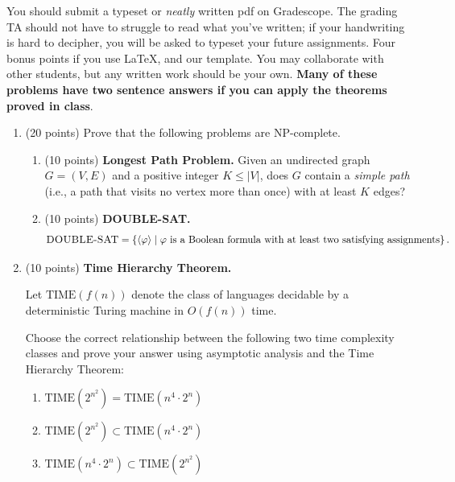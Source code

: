 \documentclass[11pt]{article}
\begin{document}

You should submit a typeset or \emph{neatly} written pdf on Gradescope.  The grading TA should not have to struggle to read what you've written; if your handwriting is hard to decipher, you will be asked to typeset your future assignments. Four bonus points if you use \LaTeX, and our template. You may collaborate with other students, but any written work should be your own. \textbf{Many of these problems have two sentence answers if you can apply the theorems proved in class}.


\begin{enumerate} 

        \item (20 points) Prove that the following problems are NP-complete.
        \begin{enumerate}
          \item (10 points) \textbf{Longest Path Problem.} Given an undirected graph \( G = (V, E) \) and a positive integer \( K \leq |V| \), does \( G \) contain a \emph{simple path} (i.e., a path that visits no vertex more than once) with at least \( K \) edges?

        \begin{answer}
        \end{answer}
        
        \item (10 points) \textbf{DOUBLE-SAT.} \[
\textsc{DOUBLE-SAT} = \left\{ \langle \varphi \rangle \mid \varphi \text{ is a Boolean formula with at least two satisfying assignments} \right\}.
\]
        \begin{answer}

        \end{answer}

            \end{enumerate}
\item (10 points) \textbf{Time Hierarchy Theorem.} 

Let \( \text{TIME}(f(n)) \) denote the class of languages decidable by a deterministic Turing machine in \( O(f(n)) \) time.

Choose the correct relationship between the following two time complexity classes and prove your answer using asymptotic analysis and the Time Hierarchy Theorem:
\begin{enumerate}
    \item \( \text{TIME}(2^{n^2}) = \text{TIME}(n^4 \cdot 2^n) \)
    \item \( \text{TIME}(2^{n^2}) \subset \text{TIME}(n^4 \cdot 2^n) \)
    \item \( \text{TIME}(n^4 \cdot 2^n) \subset \text{TIME}(2^{n^2}) \)


\end{enumerate}
\end{enumerate}
\end{document}
